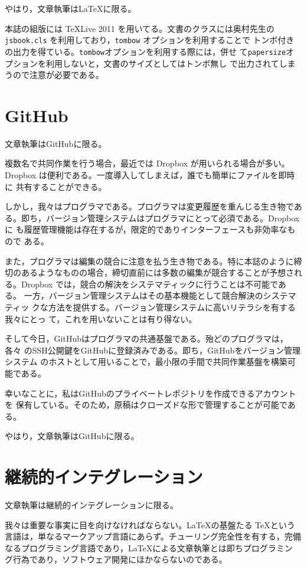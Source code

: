 やはり，文章執筆はLaTeXに限る。

本誌の組版には \TeX Live 2011 を用いてる。文書のクラスには奥村先生の
{\tt jsbook.cls} を利用しており，{\tt tombow} オプションを利用することで
トンボ付きの出力を得ている。{\tt tombow}オプションを利用する際には，併せ
て{\tt papersize}オプションを利用しないと，文書のサイズとしてはトンボ無し
で出力されてしまうので注意が必要である。

\section{GitHub}

文章執筆はGitHubに限る。

複数名で共同作業を行う場合，最近では Dropbox が用いられる場合が多い。
Dropbox は便利である。一度導入してしまえば，誰でも簡単にファイルを即時に
共有することができる。

しかし，我々はプログラマである。プログラマは変更履歴を重んじる生き物であ
る。即ち，バージョン管理システムはプログラマにとって必須である。Dropboxに
も履歴管理機能は存在するが，限定的でありインターフェースも非効率なもので
ある。

また，プログラマは編集の競合に注意を払う生き物である。特に本誌のように締
切のあるようなものの場合，締切直前には多数の編集が競合することが予想され
る。Dropbox では，競合の解決をシステマティックに行うことは不可能である。
一方，バージョン管理システムはその基本機能として競合解決のシステマティッ
クな方法を提供する。バージョン管理システムに高いリテラシを有する我々にとっ
て，これを用いないことは有り得ない。

そして今日，GitHubはプログラマの共通基盤である。殆どのプログラマは，各々
のSSH公開鍵をGitHubに登録済みである。即ち，GitHubをバージョン管理システム
のホストとして用いることで，最小限の手間で共同作業基盤を構築可能である。

幸いなことに，私はGitHubのプライベートレポジトリを作成できるアカウントを
保有している。そのため，原稿はクローズドな形で管理することが可能である。

やはり，文章執筆はGitHubに限る。

\section{継続的インテグレーション}

文章執筆は継続的インテグレーションに限る。

我々は重要な事実に目を向けなければならない。\LaTeX の基盤たる \TeX という
言語は，単なるマークアップ言語にあらず。チューリング完全性を有する，完備
なるプログラミング言語であり，\LaTeX による文章執筆とは即ちプログラミン
グ行為であり，ソフトウェア開発にほかならないのである。

